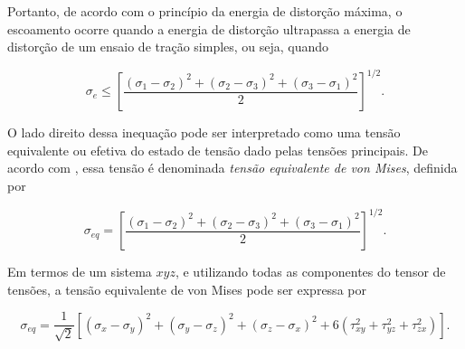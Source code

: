 Portanto, de acordo com o princípio da energia de distorção máxima, o escoamento ocorre quando a energia de distorção ultrapassa a energia de distorção de um ensaio de tração simples, ou seja, quando \cite{Hibbeler}

\begin{equation}
    \sigma_e \leq \left[\frac{(\sigma_1 - \sigma_2)^2 + (\sigma_2 - \sigma_3)^2 + (\sigma_3 - \sigma_1)^2}{2} \right]^{1/2}.
\end{equation}

O lado direito dessa inequação pode ser interpretado como uma tensão equivalente ou efetiva do estado de tensão dado pelas tensões principais. De acordo com \cite{Hibbeler}, essa tensão é denominada \emph{tensão equivalente de von Mises}, definida por

\begin{equation}
    \sigma_{eq} = \left[\frac{(\sigma_1 - \sigma_2)^2 + (\sigma_2 - \sigma_3)^2 + (\sigma_3 - \sigma_1)^2}{2} \right]^{1/2}.
    \label{eq:tensao_equivalente_von_mises}
\end{equation}

Em termos de um sistema $xyz$, e utilizando todas as componentes do tensor de tensões, a tensão equivalente de von Mises pode ser expressa por 

\begin{equation}
    \sigma_{eq} = \frac{1}{\sqrt{2}} \left[ (\sigma_x - \sigma_y)^2 + (\sigma_y - \sigma_z)^2 + (\sigma_z - \sigma_x)^2 + 6(\tau_{xy}^2 + \tau_{yz}^2 + \tau_{zx}^2)\right].
    \label{eq:tensao_equivalente_von_mises_xyz}
\end{equation}